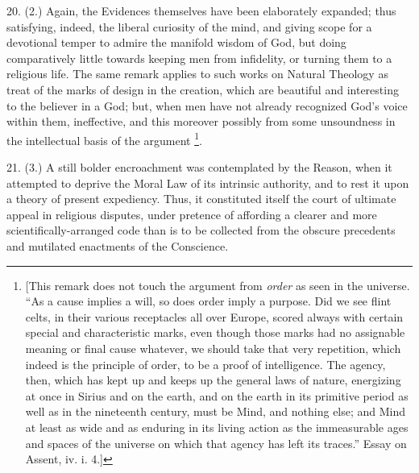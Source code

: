 20. (2.) Again, the Evidences themselves have been elaborately
expanded; thus satisfying, indeed, the liberal curiosity of the mind,
and giving scope for a devotional temper to admire the manifold wisdom
of God, but doing comparatively little towards keeping men from
infidelity, or turning them to a religious life. The same remark
applies to such works on Natural Theology as treat of the marks of
design in the creation, which are beautiful and interesting to the
believer in a God; but, when men have not already recognized God's
voice within them, ineffective, and this moreover possibly from some
unsoundness in the intellectual basis of the argument \footnote{[This remark
does not touch the argument from \emph{order} as seen in the universe.
``As a cause implies a will, so does order imply a purpose. Did we
see flint celts, in their various receptacles all over Europe, scored
always with certain special and characteristic marks, even though
those marks had no assignable meaning or final cause whatever, we
should take that very repetition, which indeed is the principle of
order, to be a proof of intelligence. The agency, then, which has kept
up and keeps up the general laws of nature, energizing at once in
Sirius and on the earth, and on the earth in its primitive period as
well as in the nineteenth century, must be Mind, and nothing else; and
Mind at least as wide and as enduring in its living action as the
immeasurable ages and spaces of the universe on which that agency has
left its traces.'' Essay on
Assent, iv. i. 4.]}.

21. (3.) A still bolder encroachment was contemplated by the
Reason, when it attempted to deprive the Moral Law of its intrinsic
authority, and to rest it upon a theory of present expediency. Thus,
it constituted itself the court of ultimate appeal in religious
disputes, under pretence of affording a clearer and more
scientifically-arranged code than is to be collected from the obscure
precedents and mutilated enactments of the Conscience.

